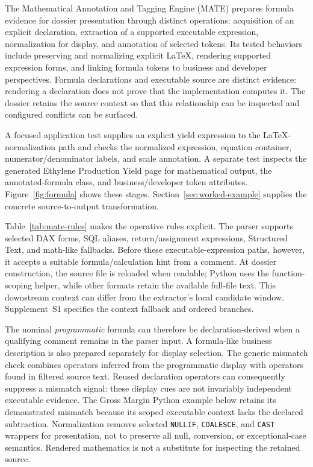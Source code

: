 \documentclass[a4paper,fleqn]{cas-dc}
\begin{document}
The Mathematical Annotation and Tagging Engine (MATE) prepares formula evidence for dossier presentation through distinct operations: acquisition of an explicit declaration, extraction of a supported executable expression, normalization for display, and annotation of selected tokens. Its tested behaviors include preserving and normalizing explicit LaTeX, rendering supported expression forms, and linking formula tokens to business and developer perspectives. Formula declarations and executable source are distinct evidence: rendering a declaration does not prove that the implementation computes it. The dossier retains the source context so that this relationship can be inspected and configured conflicts can be surfaced.

A focused application test supplies an explicit yield expression to the LaTeX-normalization path and checks the normalized expression, equation container, numerator/denominator labels, and scale annotation. A separate test inspects the generated Ethylene Production Yield page for mathematical output, the annotated-formula class, and business/developer token attributes. Figure~\ref{fig:formula} shows these stages. Section~\ref{sec:worked-example} supplies the concrete source-to-output transformation.

Table~\ref{tab:mate-rules} makes the operative rules explicit. The parser supports selected DAX forms, SQL aliases, return/assignment expressions, Structured Text, and math-like fallbacks. Before these executable-expression paths, however, it accepts a suitable formula/calculation hint from a comment. At dossier construction, the source file is reloaded when readable; Python uses the function-scoping helper, while other formats retain the available full-file text. This downstream context can differ from the extractor's local candidate window. Supplement~S1 specifies the context fallback and ordered branches.

The nominal \emph{programmatic} formula can therefore be declaration-derived when a qualifying comment remains in the parser input. A formula-like business description is also prepared separately for display selection. The generic mismatch check combines operators inferred from the programmatic display with operators found in filtered source text. Reused declaration operators can consequently suppress a mismatch signal: these display cues are not invariably independent executable evidence. The Gross Margin Python example below retains its demonstrated mismatch because its scoped executable context lacks the declared subtraction. Normalization removes selected \texttt{NULLIF}, \texttt{COALESCE}, and \texttt{CAST} wrappers for presentation, not to preserve all null, conversion, or exceptional-case semantics. Rendered mathematics is not a substitute for inspecting the retained source.
\end{document}
